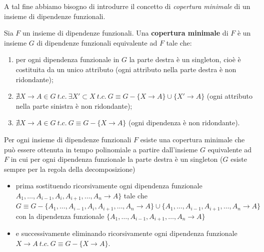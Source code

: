A tal fine abbiamo bisogno di introdurre il concetto di \emph{copertura minimale} di un insieme di dipendenze funzionali.
\begin{defn}
Sia $F$ un insieme di dipendenze funzionali. Una \textbf{copertura minimale} di $F$ è un insieme $G$ di dipendenze 
funzionali equivalente ad $F$ tale che:
\begin{enumerate}
 \item per ogni dipendenza funzionale in $G$ la parte destra è un singleton, cioè è costituita da un unico
attributo (ogni attributo nella parte destra è non ridondante);
 \item $\nexists X \rightarrow A \in G\ t.c.\ \exists X' \subset X\ t.c.\ G \equiv G - \{X \rightarrow A\} 
 \cup \{X' \rightarrow A\}$ (ogni attributo nella parte sinistra è non ridondante);
 \item $\nexists X \rightarrow A \in G\ t.c.\ G \equiv G - \{X \rightarrow A\}$ (ogni dipendenza è non ridondante). 
\end{enumerate}
\end{defn}
Per ogni insieme di dipendenze funzionali $F$ esiste una copertura minimale che può essere ottenuta in tempo polinomiale
a partire dall'insieme $G$ equivalente ad $F$ in cui per ogni dipendenza funzionale la parte destra è un singleton 
($G$ esiste sempre per la regola della decomposizione)
\begin{itemize}
 \item prima sostituendo ricorsivamente ogni dipendenza funzionale $A_1, \ldots, A_{i-1}, A_i, A_{i+1}, \ldots, A_n 
 \rightarrow A\}$ tale che $G \equiv G - \{A_1, \ldots, A_{i-1}, A_i, A_{i+1}, \ldots, A_n \rightarrow A\} \cup 
 \{A_1, \ldots, A_{i-1}, A_{i+1}, \ldots, A_n \rightarrow A\}$ con la dipendenza funzionale $\{A_1, \ldots, A_{i-1}, A_{i+1},
 \ldots, A_n \rightarrow A\}$
 \item e successivamente eliminando ricorsivamente ogni dipendenza funzionale $X \rightarrow A\ t.c.\ G \equiv G- 
 \{X \rightarrow A\}$.
\end{itemize}
 
